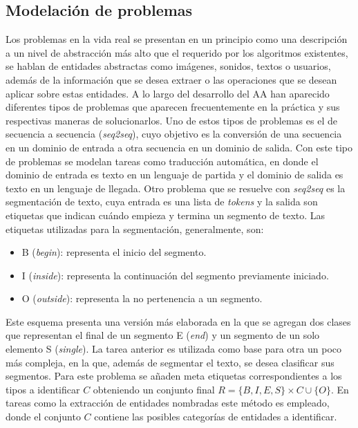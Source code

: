 \subsection{Modelación de problemas}

Los problemas en la vida real se presentan en un principio como una descripción a un nivel de abstracción 
más alto que el requerido por los algoritmos existentes, se hablan de entidades abstractas como imágenes,
sonidos, textos o usuarios, además de la información que se desea extraer o las operaciones que se
desean aplicar sobre estas entidades. A lo largo del desarrollo del AA han aparecido diferentes tipos de problemas 
que aparecen frecuentemente en la práctica y sus respectivas maneras de solucionarlos. Uno de estos tipos de problemas
es el de secuencia a secuencia (\emph{seq2seq}), cuyo objetivo es la conversión de una secuencia en un dominio de entrada a otra 
secuencia en un dominio de salida. Con este tipo de problemas se modelan tareas como traducción automática, en 
donde el dominio de entrada es texto en un lenguaje de partida y el dominio de salida es texto en un lenguaje de llegada.
Otro problema que se resuelve con \emph{seq2seq} es la segmentación de texto, cuya entrada es una lista de \emph{tokens}
y la salida son etiquetas que indican cuándo empieza y termina un segmento de texto. Las etiquetas utilizadas para 
la segmentación, generalmente, son:

\begin{itemize}
	\item B (\emph{begin}): representa el inicio del segmento.
	\item I (\emph{inside}): representa la continuación del segmento previamente iniciado.
	\item O (\emph{outside}): representa la no pertenencia a un segmento.
\end{itemize}

Este esquema presenta una versión más elaborada en la que se agregan dos clases que representan el final 
de un segmento E (\emph{end}) y un segmento de un solo elemento S (\emph{single}). La tarea anterior es 
utilizada como base para otra un poco más compleja, en la que, además de segmentar el texto, se desea 
clasificar sus segmentos. Para este problema se añaden meta etiquetas correspondientes a los tipos a identificar $C$ 
obteniendo un conjunto final $R = \{ B, I, E, S \} \times C \cup \{ O \}$. En tareas como la extracción de entidades
nombradas este método es empleado, donde el conjunto $C$ contiene las posibles categorías de entidades a identificar.

